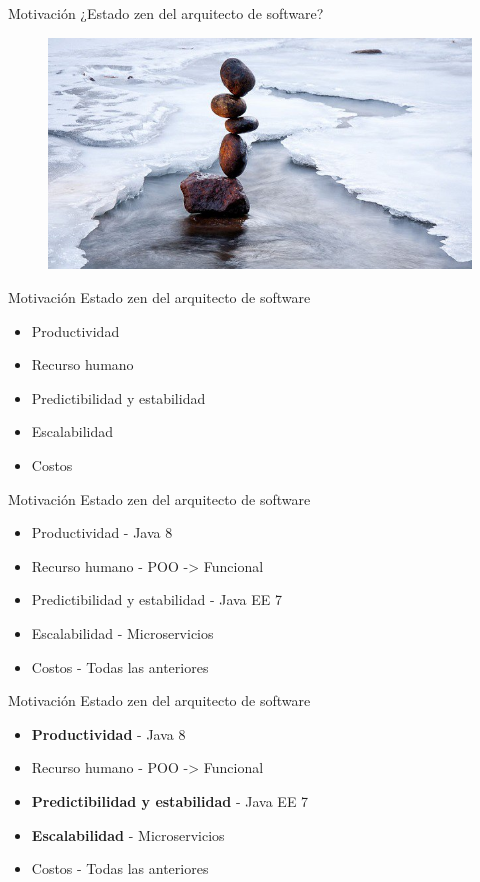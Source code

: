 \documentclass{beamer}
\begin{document}
\begin{frame}{Motivación}
¿Estado zen del arquitecto de software?
\begin{figure}
	\centering
	\includegraphics[width=\linewidth]{Images/zen}
\end{figure}
\end{frame}

\begin{frame}{Motivación}
Estado zen del arquitecto de software
\begin{itemize}
	\item Productividad
	\item Recurso humano
	\item Predictibilidad y estabilidad
	\item Escalabilidad
	\item Costos
\end{itemize}
\end{frame}

\begin{frame}{Motivación}
Estado zen del arquitecto de software
\begin{itemize}
	\item Productividad - Java 8
	\item Recurso humano - POO -> Funcional
	\item Predictibilidad y estabilidad - Java EE 7
	\item Escalabilidad - Microservicios
	\item Costos - Todas las anteriores
\end{itemize}
\end{frame}

\begin{frame}{Motivación}
Estado zen del arquitecto de software
\begin{itemize}
	\item \textbf{Productividad} - Java 8
	\item Recurso humano - POO -> Funcional
	\item \textbf{Predictibilidad y estabilidad} - Java EE 7
	\item \textbf{Escalabilidad} - Microservicios
	\item Costos - Todas las anteriores
\end{itemize}
\end{frame}
\end{document}
